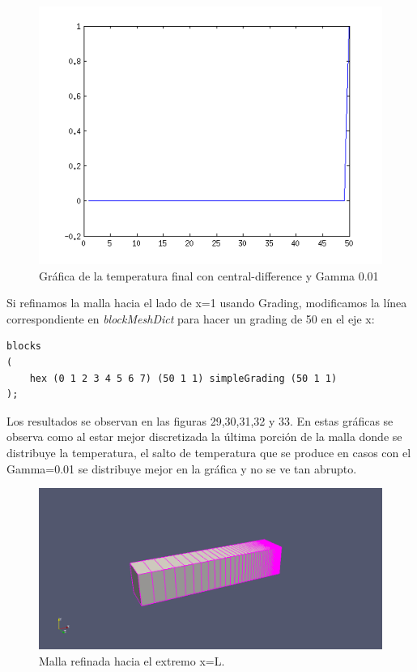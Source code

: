 \documentclass[11pt]{article}
\begin{document}
\begin{figure}[tbh]
	\centering
		\includegraphics[width=1.0\textwidth]{imagen28.png}
	\caption{Gr\'afica de la temperatura final con central-difference y Gamma 0.01}
	\label{fig:Fig1}
\end{figure}

\bigskip Si refinamos la malla hacia el lado de x=1 usando Grading, modificamos la l\'inea correspondiente en \textit{blockMeshDict} para hacer un grading de 50 en el eje x: 

\bigskip
\lstset{language=Matlab, breaklines=true, basicstyle=\footnotesize}
\begin{lstlisting}[frame=single]
blocks
(
    hex (0 1 2 3 4 5 6 7) (50 1 1) simpleGrading (50 1 1)
);
\end{lstlisting}
\bigskip

Los resultados se observan en las figuras 29,30,31,32 y 33. En estas gr\'aficas se observa como al estar mejor discretizada la \'ultima porci\'on de la malla donde se distribuye la temperatura, el salto de temperatura que se produce en casos con el Gamma=0.01 se distribuye mejor en la gr\'afica y no se ve tan abrupto.

\begin{figure}[tbh]
	\centering
		\includegraphics[width=1.0\textwidth]{imagen29.png}
	\caption{Malla refinada hacia el extremo x=L.}
	\label{fig:Fig1}
\end{figure}
\end{document}
